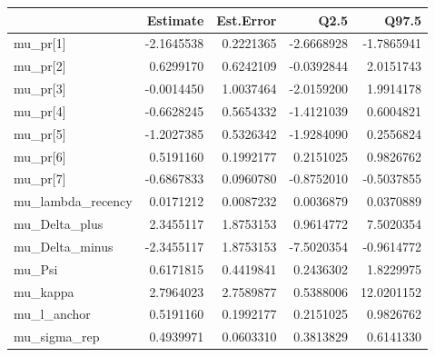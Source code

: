 
\begin{tabular}{lrrrr}
\toprule
  & Estimate & Est.Error & Q2.5 & Q97.5\\
\midrule
mu\_pr[1] & -2.1645538 & 0.2221365 & -2.6668928 & -1.7865941\\
mu\_pr[2] & 0.6299170 & 0.6242109 & -0.0392844 & 2.0151743\\
mu\_pr[3] & -0.0014450 & 1.0037464 & -2.0159200 & 1.9914178\\
mu\_pr[4] & -0.6628245 & 0.5654332 & -1.4121039 & 0.6004821\\
mu\_pr[5] & -1.2027385 & 0.5326342 & -1.9284090 & 0.2556824\\
\addlinespace
mu\_pr[6] & 0.5191160 & 0.1992177 & 0.2151025 & 0.9826762\\
mu\_pr[7] & -0.6867833 & 0.0960780 & -0.8752010 & -0.5037855\\
mu\_lambda\_recency & 0.0171212 & 0.0087232 & 0.0036879 & 0.0370889\\
mu\_Delta\_plus & 2.3455117 & 1.8753153 & 0.9614772 & 7.5020354\\
mu\_Delta\_minus & -2.3455117 & 1.8753153 & -7.5020354 & -0.9614772\\
\addlinespace
mu\_Psi & 0.6171815 & 0.4419841 & 0.2436302 & 1.8229975\\
mu\_kappa & 2.7964023 & 2.7589877 & 0.5388006 & 12.0201152\\
mu\_l\_anchor & 0.5191160 & 0.1992177 & 0.2151025 & 0.9826762\\
mu\_sigma\_rep & 0.4939971 & 0.0603310 & 0.3813829 & 0.6141330\\
\bottomrule
\end{tabular}
